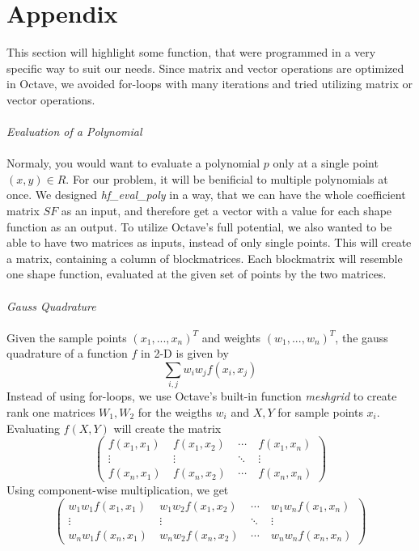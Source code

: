 \documentclass[a4paper,12pt]{article}
\begin{document}
\section{Appendix}
This section will highlight some function, that were programmed in a very specific way to suit our needs. Since matrix and vector operations are optimized in Octave, we avoided for-loops with many iterations and tried utilizing matrix or vector operations.\\ \\
\textit{Evaluation of a Polynomial}\\ \\
Normaly, you would want to evaluate a polynomial $p$ only at a single point $(x,y)\in\!R$. For our problem, it will be benificial to multiple polynomials at once. We designed \textit{hf\_eval\_poly} in a way, that we can have the whole coefficient matrix $SF$ as an input, and therefore get a vector with a value for each shape function as an output. To utilize Octave's full potential, we also wanted to be able to have two matrices as inputs, instead of only single points. This will create a matrix, containing a column of blockmatrices. Each blockmatrix will resemble one shape function, evaluated at the given set of points by the two matrices.\\ \\
\newpage
\textit{Gauss Quadrature}\\ \\
Given the sample points $(x_1,...,x_n)^T$ and weights $(w_1,...,w_n)^T$, the gauss quadrature of a function $f$ in 2-D is given by
\[\sum_{i,j} w_i w_j f(x_i,x_j)\]
Instead of using for-loops, we use Octave's built-in function \textit{meshgrid} to create rank one matrices $W_1,W_2$ for the weigths $w_i$ and $X,Y$ for sample points $x_i$. Evaluating $f(X,Y)$ will create the matrix 
\[\begin{pmatrix} f(x_1,x_1) &\ f(x_1,x_2) &\ \cdots &\ f(x_1,x_n) \\
\vdots &\ \vdots &\ \ddots &\ \vdots \\ 
f(x_n,x_1) &\ f(x_n,x_2) &\ \cdots &\ f(x_n,x_n) \end{pmatrix} \]
Using component-wise multiplication, we get 
\[\begin{pmatrix} w_1 w_ 1f(x_1,x_1) &\ w_1 w_2 f(x_1,x_2) &\ \cdots &\ w_1 w_n f(x_1,x_n) \\
\vdots &\ \vdots &\ \ddots &\ \vdots \\ 
w_n w_1 f(x_n,x_1) &\ w_n w_2 f(x_n,x_2) &\ \cdots &\ w_n w_n f(x_n,x_n) \end{pmatrix} \]
\end{document}
